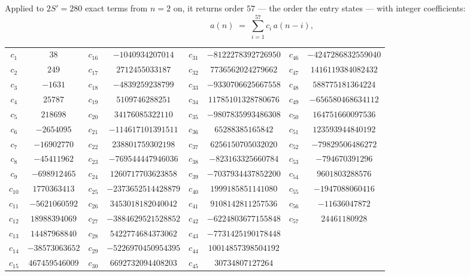 \documentclass[11pt,a4paper]{article}
\theoremstyle{plain}
\theoremstyle{definition}
\begin{document}
Applied to $2S'=280$ exact terms from $n=2$ on, it returns order $57$ --- the
order the entry states --- with integer coefficients:
\[
a(n)\;=\;\sum_{i=1}^{57}c_i\,a(n-i),
\]
\begin{center}\small
\begin{tabular}{cccccccc}
$c_{1}$ & $38$ & $c_{16}$ & $-1040934207014$ & $c_{31}$ & $-8122278392726950$ & $c_{46}$ & $-4247286832559040$ \\
$c_{2}$ & $249$ & $c_{17}$ & $2712455033187$ & $c_{32}$ & $7736562024279662$ & $c_{47}$ & $1416119384082432$ \\
$c_{3}$ & $-1631$ & $c_{18}$ & $-4839259238799$ & $c_{33}$ & $-9330706625667558$ & $c_{48}$ & $588775181364224$ \\
$c_{4}$ & $25787$ & $c_{19}$ & $5109746288251$ & $c_{34}$ & $11785101328780676$ & $c_{49}$ & $-656580468634112$ \\
$c_{5}$ & $218698$ & $c_{20}$ & $34176085322110$ & $c_{35}$ & $-9807835993486308$ & $c_{50}$ & $164751660097536$ \\
$c_{6}$ & $-2654095$ & $c_{21}$ & $-114617101391511$ & $c_{36}$ & $65288385165842$ & $c_{51}$ & $123593944840192$ \\
$c_{7}$ & $-16902770$ & $c_{22}$ & $238801759302198$ & $c_{37}$ & $6256150705032020$ & $c_{52}$ & $-79829506486272$ \\
$c_{8}$ & $-45411962$ & $c_{23}$ & $-769544447946036$ & $c_{38}$ & $-823163325660784$ & $c_{53}$ & $-794670391296$ \\
$c_{9}$ & $-698912465$ & $c_{24}$ & $1260717703623858$ & $c_{39}$ & $-7037934437852200$ & $c_{54}$ & $9601803288576$ \\
$c_{10}$ & $1770363413$ & $c_{25}$ & $-2373652514428879$ & $c_{40}$ & $1999185851141080$ & $c_{55}$ & $-1947088060416$ \\
$c_{11}$ & $-5621060592$ & $c_{26}$ & $3453018182040042$ & $c_{41}$ & $9108142811257536$ & $c_{56}$ & $-11636047872$ \\
$c_{12}$ & $18988394069$ & $c_{27}$ & $-3884629521528852$ & $c_{42}$ & $-6224803677155848$ & $c_{57}$ & $24461180928$ \\
$c_{13}$ & $14487968840$ & $c_{28}$ & $5422774684373062$ & $c_{43}$ & $-7731425190178448$ &  &  \\
$c_{14}$ & $-38573063652$ & $c_{29}$ & $-5226970450954395$ & $c_{44}$ & $10014857398504192$ &  &  \\
$c_{15}$ & $467459546009$ & $c_{30}$ & $6692732094408203$ & $c_{45}$ & $30734807127264$ &  &  \\
\end{tabular}
\end{center}
\end{document}

